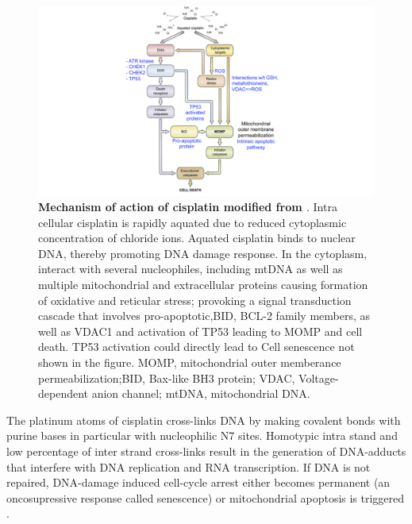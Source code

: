 \begin{figure}
\centering
\includegraphics[width=\textwidth]{Figures/chap1/CisplatinMA.png}
	\caption[Mechanism of action of cisplatin]
	{\small
	    \textbf{Mechanism of action of cisplatin modified from \cite{galluzzi2012molecular}}.
	     Intra cellular cisplatin is rapidly aquated due to reduced cytoplasmic concentration of chloride ions. Aquated cisplatin binds to nuclear DNA, thereby promoting DNA damage response. In the cytoplasm, interact with several nucleophiles, including mtDNA as well as multiple mitochondrial and extracellular proteins causing formation of oxidative and reticular stress; provoking a signal transduction cascade that involves pro-apoptotic,BID, BCL-2 family members, as well as VDAC1 and activation of TP53 leading to MOMP and cell death.
	    TP53 activation could directly lead to Cell senescence not shown in the figure. MOMP, mitochondrial outer memberance permeabilization;BID, Bax-like BH3 protein; VDAC, Voltage-dependent anion channel; mtDNA, mitochondrial DNA.
	}
	\label{fig:CisplatinMA}
\end{figure}

The platinum atoms of cisplatin cross-links DNA by making covalent bonds with purine bases in particular with nucleophilic N7 sites. Homotypic intra stand and low percentage of inter strand cross-links result in the generation of DNA-adducts that interfere with DNA replication and RNA transcription. If DNA is not repaired, DNA-damage induced cell-cycle arrest either becomes permanent (an oncosupressive response called senescence) or mitochondrial apoptosis is triggered \cite{fichtinger1985adducts, rabik2007molecular,lopez2013hallmarks}. 

